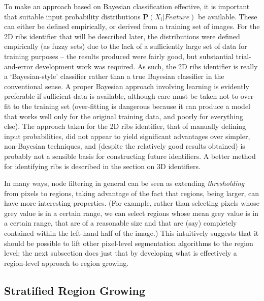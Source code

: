 To make an approach based on Bayesian classification effective, it is important that suitable input probability distributions $\mathbf{P}(X_i | \textit{Feature})$ be available. These can either be defined empirically, or derived from a training set of images. For the 2D ribs identifier that will be described later, the distributions were defined empirically (as fuzzy sets) due to the lack of a sufficiently large set of data for training purposes -- the results produced were fairly good, but substantial trial-and-error development work was required. As such, the 2D ribs identifier is really a `Bayesian-style' classifier rather than a true Bayesian classifier in the conventional sense. A proper Bayesian approach involving learning is evidently preferable if sufficient data is available, although care must be taken not to over-fit to the training set (over-fitting is dangerous because it can produce a model that works well only for the original training data, and poorly for everything else). The approach taken for the 2D ribs identifier, that of manually defining input probabilities, did not appear to yield significant advantages over simpler, non-Bayesian techniques, and (despite the relatively good results obtained) is probably not a sensible basis for constructing future identifiers. A better method for identifying ribs is described in the section on 3D identifiers.

In many ways, node filtering in general can be seen as extending \emph{thresholding} from pixels to regions, taking advantage of the fact that regions, being larger, can have more interesting properties. (For example, rather than selecting pixels whose grey value is in a certain range, we can select regions whose mean grey value is in a certain range, that are of a reasonable size and that are (say) completely contained within the left-hand half of the image.) This intuitively suggests that it should be possible to lift other pixel-level segmentation algorithms to the region level; the next subsection does just that by developing what is effectively a region-level approach to region growing.


\subsection{Stratified Region Growing}
\label{subsec:featureid-techniques-stratifiedregiongrowing}

